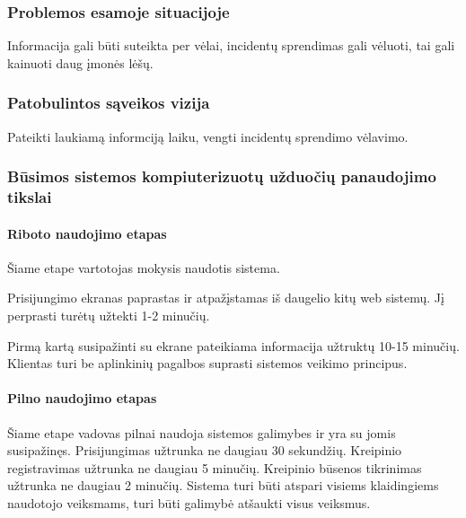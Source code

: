 		\subsubsection{Problemos esamoje situacijoje}
		
		Informacija gali būti suteikta per vėlai, incidentų sprendimas gali vėluoti, tai gali kainuoti daug įmonės lėšų.
		
		\subsubsection{Patobulintos sąveikos vizija}
		
		Pateikti laukiamą informciją laiku, vengti incidentų sprendimo vėlavimo.
		
		\subsubsection{Būsimos sistemos kompiuterizuotų užduočių panaudojimo tikslai}
		
			\setcounter{tocdepth}{5} \setcounter{secnumdepth}{5}
			
			\paragraph{Riboto naudojimo etapas}
			
			Šiame etape vartotojas mokysis naudotis sistema.
			
			Prisijungimo ekranas paprastas ir atpažįstamas iš daugelio kitų web sistemų.
			Jį perprasti turėtų užtekti 1-2 minučių.

			Pirmą kartą susipažinti su ekrane pateikiama informacija užtruktų 10-15 minučių.
			Klientas turi be aplinkinių pagalbos suprasti sistemos veikimo principus.
			
			\setcounter{tocdepth}{5} \setcounter{secnumdepth}{5}
			
			\paragraph{Pilno naudojimo etapas}
			
			Šiame etape vadovas pilnai naudoja sistemos galimybes ir yra su jomis susipažinęs.
			Prisijungimas užtrunka ne daugiau 30 sekundžių. Kreipinio registravimas užtrunka ne daugiau 5 minučių.
			Kreipinio būsenos tikrinimas užtrunka ne daugiau 2 minučių.
			Sistema turi būti atspari visiems klaidingiems naudotojo veiksmams, turi būti galimybė atšaukti visus veiksmus.
			
